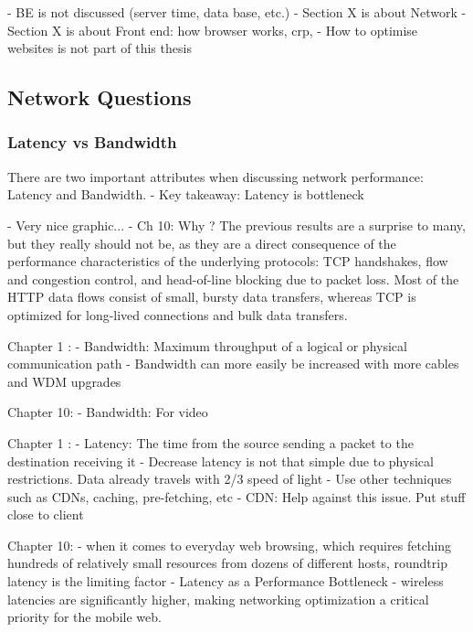 - BE is not discussed (server time, data base, etc.)
- Section X is about Network
- Section X is about Front end: how browser works, crp, 
- How to optimise websites is not part of this thesis





\subsection{Network Questions}

\subsubsection{Latency vs Bandwidth}

There are two important attributes when discussing network performance: Latency and Bandwidth.
- Key takeaway: Latency is bottleneck

- Very nice graphic...
- Ch 10: Why ? The previous results are a surprise to many, but they really should not be, as they are a direct consequence of the performance characteristics of the underlying protocols: TCP handshakes, flow and congestion control, and head-of-line blocking due to packet loss. Most of the HTTP data flows consist of small, bursty data transfers, whereas TCP is optimized for long-lived connections and bulk data transfers.



Chapter 1 :
- Bandwidth: Maximum throughput of a logical or physical communication path
- Bandwidth can more easily be increased with more cables and WDM upgrades

Chapter 10:
- Bandwidth: For video



Chapter 1 :
- Latency: The time from the source sending a packet to the destination receiving it
- Decrease latency is not that simple due to physical restrictions. Data already travels with 2/3 speed of light
- Use other techniques such as CDNs, caching, pre-fetching, etc
- CDN: Help against this issue. Put stuff close to client

Chapter 10:
- when it comes to everyday web browsing, which requires fetching hundreds of relatively small resources from dozens of different hosts, roundtrip latency is the limiting factor
- Latency as a Performance Bottleneck
-  wireless latencies are significantly higher, making networking optimization a critical priority for the mobile web.


